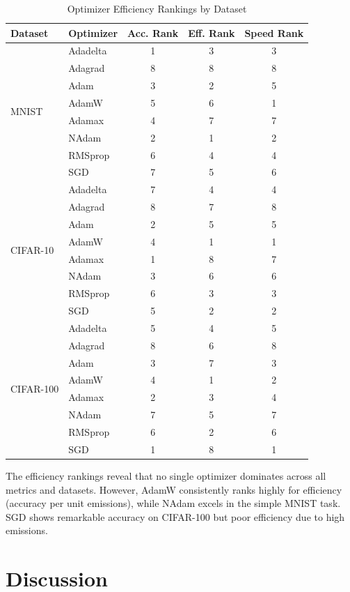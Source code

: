 \documentclass[conference]{IEEEtran}
\begin{document}
\begin{table}[htbp]
\centering
\caption{Optimizer Efficiency Rankings by Dataset}
\label{tab:efficiency_rankings}
\footnotesize
\begin{tabular}{@{}llccc@{}}
\toprule
Dataset & Optimizer & Acc. Rank & Eff. Rank & Speed Rank \\
\midrule
\multirow{8}{*}{MNIST}
& Adadelta & 1 & 3 & 3 \\
& Adagrad & 8 & 8 & 8 \\
& Adam & 3 & 2 & 5 \\
& AdamW & 5 & 6 & 1 \\
& Adamax & 4 & 7 & 7 \\
& NAdam & 2 & 1 & 2 \\
& RMSprop & 6 & 4 & 4 \\
& SGD & 7 & 5 & 6 \\
\midrule
\multirow{8}{*}{CIFAR-10}
& Adadelta & 7 & 4 & 4 \\
& Adagrad & 8 & 7 & 8 \\
& Adam & 2 & 5 & 5 \\
& AdamW & 4 & 1 & 1 \\
& Adamax & 1 & 8 & 7 \\
& NAdam & 3 & 6 & 6 \\
& RMSprop & 6 & 3 & 3 \\
& SGD & 5 & 2 & 2 \\
\midrule
\multirow{8}{*}{CIFAR-100}
& Adadelta & 5 & 4 & 5 \\
& Adagrad & 8 & 6 & 8 \\
& Adam & 3 & 7 & 3 \\
& AdamW & 4 & 1 & 2 \\
& Adamax & 2 & 3 & 4 \\
& NAdam & 7 & 5 & 7 \\
& RMSprop & 6 & 2 & 6 \\
& SGD & 1 & 8 & 1 \\
\bottomrule
\end{tabular}
\end{table}

The efficiency rankings reveal that no single optimizer dominates across all metrics and datasets. However, AdamW consistently ranks highly for efficiency (accuracy per unit emissions), while NAdam excels in the simple MNIST task. SGD shows remarkable accuracy on CIFAR-100 but poor efficiency due to high emissions.

\section{Discussion}
\end{document}

